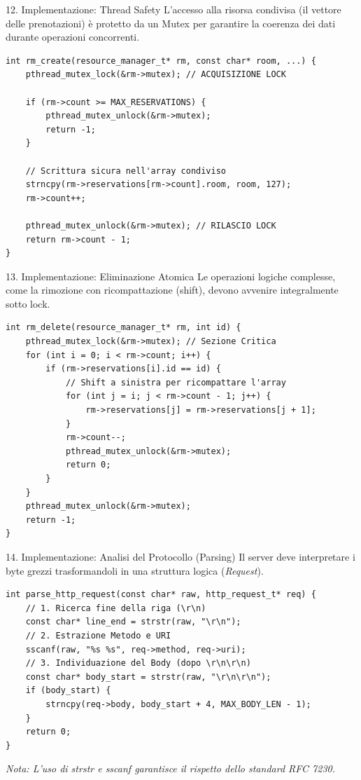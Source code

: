 \documentclass[aspectratio=169, 10pt]{beamer}
\begin{document}
\begin{frame}[fragile]{12. Implementazione: Thread Safety}
    L'accesso alla risorsa condivisa (il vettore delle prenotazioni) è protetto da un Mutex per garantire la coerenza dei dati durante operazioni concorrenti.
    
\begin{lstlisting}[style=cstyle]
int rm_create(resource_manager_t* rm, const char* room, ...) {
    pthread_mutex_lock(&rm->mutex); // ACQUISIZIONE LOCK
    
    if (rm->count >= MAX_RESERVATIONS) {
        pthread_mutex_unlock(&rm->mutex);
        return -1;
    }
    
    // Scrittura sicura nell'array condiviso
    strncpy(rm->reservations[rm->count].room, room, 127);
    rm->count++;
    
    pthread_mutex_unlock(&rm->mutex); // RILASCIO LOCK
    return rm->count - 1;
}
\end{lstlisting}
\end{frame}

\begin{frame}[fragile]{13. Implementazione: Eliminazione Atomica}
    Le operazioni logiche complesse, come la rimozione con ricompattazione (shift), devono avvenire integralmente sotto lock.
    
\begin{lstlisting}[style=cstyle]
int rm_delete(resource_manager_t* rm, int id) {
    pthread_mutex_lock(&rm->mutex); // Sezione Critica
    for (int i = 0; i < rm->count; i++) {
        if (rm->reservations[i].id == id) {
            // Shift a sinistra per ricompattare l'array
            for (int j = i; j < rm->count - 1; j++) {
                rm->reservations[j] = rm->reservations[j + 1];
            }
            rm->count--;
            pthread_mutex_unlock(&rm->mutex);
            return 0;
        }
    }
    pthread_mutex_unlock(&rm->mutex);
    return -1;
}
\end{lstlisting}
\end{frame}

\begin{frame}[fragile]{14. Implementazione: Analisi del Protocollo (Parsing)}
    Il server deve interpretare i byte grezzi trasformandoli in una struttura logica (\textit{Request}).
    
\begin{lstlisting}[style=cstyle]
int parse_http_request(const char* raw, http_request_t* req) {
    // 1. Ricerca fine della riga (\r\n)
    const char* line_end = strstr(raw, "\r\n");
    // 2. Estrazione Metodo e URI
    sscanf(raw, "%s %s", req->method, req->uri);
    // 3. Individuazione del Body (dopo \r\n\r\n)
    const char* body_start = strstr(raw, "\r\n\r\n");
    if (body_start) {
        strncpy(req->body, body_start + 4, MAX_BODY_LEN - 1);
    }
    return 0;
}
\end{lstlisting}
    \textit{Nota: L'uso di strstr e sscanf garantisce il rispetto dello standard RFC 7230.}
\end{frame}
\end{document}
